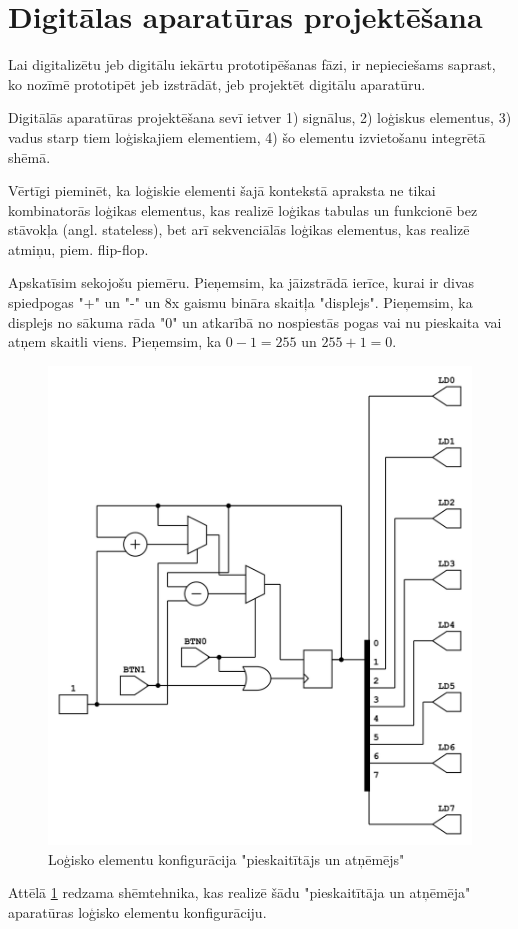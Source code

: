 \section{Digitālas aparatūras projektēšana}

Lai digitalizētu  jeb digitālu iekārtu
prototipēšanas fāzi, ir nepieciešams saprast, ko nozīmē prototipēt jeb
izstrādāt, jeb projektēt digitālu aparatūru.  
  
Digitālās aparatūras projektēšana sevī ietver 1) signālus, 2) loģiskus
elementus, 3) vadus starp tiem loģiskajiem elementiem, 4) šo elementu
izvietošanu integrētā shēmā. 
  
Vērtīgi pieminēt, ka loģiskie elementi šajā kontekstā apraksta ne tikai
kombinatorās loģikas elementus, kas realizē loģikas tabulas un funkcionē bez
stāvokļa (angl. stateless), bet arī sekvenciālās loģikas elementus, kas realizē
atmiņu, piem. flip-flop. \cite[para 1.1]{LarryMassengale2018} 

Apskatīsim sekojošu piemēru. Pieņemsim, ka jāizstrādā ierīce, kurai ir divas
spiedpogas "+" un "-" un 8x gaismu bināra skaitļa "displejs". Pieņemsim, ka
displejs no sākuma rāda "0" un atkarībā no nospiestās pogas vai nu pieskaita vai
atņem skaitli viens. Pieņemsim, ka \(0-1=255\) un \(255+1=0\).

\begin{figure}[H]
    \includegraphics[width=0.5\linewidth]{assets/counter.png}
    \centering
    \caption{Loģisko elementu konfigurācija "pieskaitītājs un atņēmējs"}
    \label{fig:counter}
\end{figure}

Attēlā \ref{fig:counter} redzama shēmtehnika, kas realizē šādu "pieskaitītāja un
atņēmēja" aparatūras loģisko elementu konfigurāciju.

